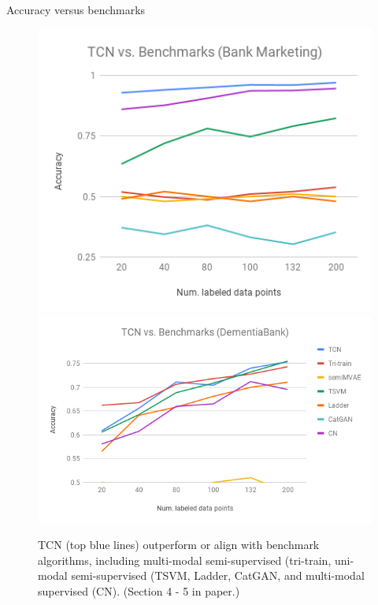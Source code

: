 \documentclass[final]{beamer}
\newlength{\onecolwid}
\begin{document}
\begin{frame}[t]
\begin{columns}[t]
\begin{column}{\onecolwid}
\begin{block}{Accuracy versus benchmarks}
\begin{figure}[h]
    \includegraphics[width=.42\textwidth]{images/accuracy_plot_bm.png}
    \includegraphics[width=.58\textwidth]{images/accuracy_plot_db.png}
    \caption{TCN (top blue lines) outperform or align with benchmark algorithms, including multi-modal semi-supervised (tri-train, uni-modal semi-supervised (TSVM, Ladder, CatGAN, and multi-modal supervised (CN). (Section 4 - 5 in paper.)}
    \label{fig:accuracy_tcn_vs_benchmarks}
\end{figure}
\end{block}




%
%



\end{column} %

\end{columns} %

\end{frame} %
\end{document}
